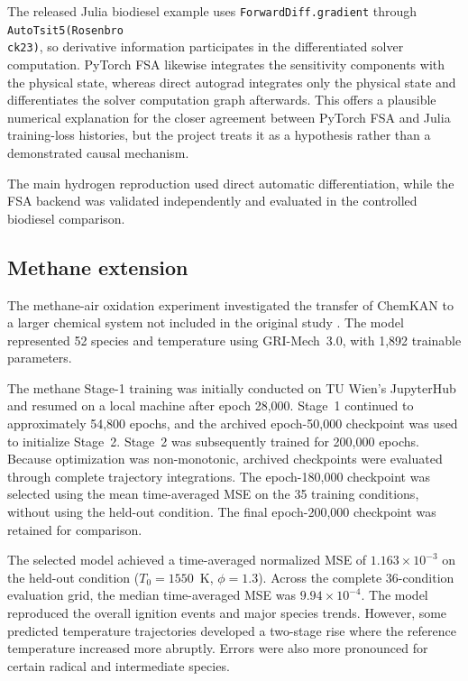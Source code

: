 \documentclass[11pt,a4paper]{article}
\begin{document}
The released Julia biodiesel example uses \texttt{ForwardDiff.gradient} through \texttt{AutoTsit5(Rosenbro\\ck23)}, so derivative information participates in the differentiated solver computation. PyTorch FSA likewise integrates the sensitivity components with the physical state, whereas direct autograd integrates only the physical state and differentiates the solver computation graph afterwards. This offers a plausible numerical explanation for the closer agreement between PyTorch FSA and Julia training-loss histories, but the project treats it as a hypothesis rather than a demonstrated causal mechanism.

The main hydrogen reproduction used direct
automatic differentiation, while the FSA
backend was validated independently and
evaluated in the controlled biodiesel comparison.


\subsection{Methane extension}


The methane-air oxidation experiment investigated
the transfer of ChemKAN to a larger chemical
system not included in the original study
\cite{Koenig_2025}. The model represented
52 species and temperature using GRI-Mech~3.0,
with 1,892 trainable parameters.

The methane Stage-1 training was initially
conducted on TU Wien's JupyterHub and resumed
on a local machine after epoch 28,000.
Stage~1 continued to approximately 54,800 epochs,
and the archived epoch-50,000 checkpoint was
used to initialize Stage~2. Stage~2 was
subsequently trained for 200,000 epochs. Because optimization was non-monotonic, archived
checkpoints were evaluated through complete
trajectory integrations. The epoch-180,000
checkpoint was selected using the mean
time-averaged MSE on the 35 training conditions,
without using the held-out condition.
The final epoch-200,000 checkpoint was
retained for comparison.


The selected model achieved a time-averaged
normalized MSE of $1.163\times10^{-3}$ on the
held-out condition
($T_0=1550$~K, $\phi=1.3$).
Across the complete 36-condition evaluation
grid, the median time-averaged MSE was
$9.94\times10^{-4}$. The model reproduced the overall ignition
events and major species trends. However,
some predicted temperature trajectories
developed a two-stage rise where the
reference temperature increased more
abruptly. Errors were also more pronounced
for certain radical and intermediate species. 
\end{document}
